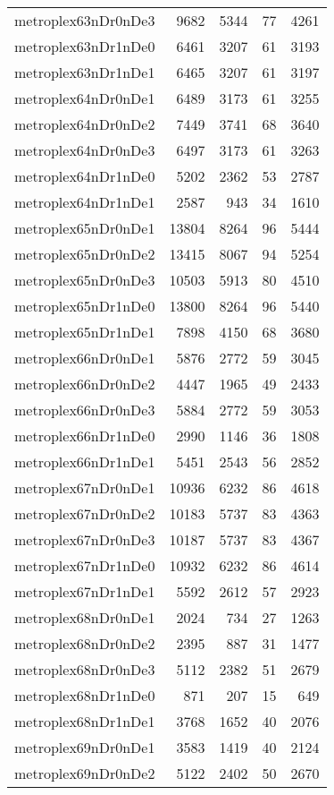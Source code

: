 \begin{longtable}{lrrrr}
metroplex63nDr0nDe3 & 9682 & 5344 & 77 & 4261 \\
metroplex63nDr1nDe0 & 6461 & 3207 & 61 & 3193 \\
metroplex63nDr1nDe1 & 6465 & 3207 & 61 & 3197 \\
metroplex64nDr0nDe1 & 6489 & 3173 & 61 & 3255 \\
metroplex64nDr0nDe2 & 7449 & 3741 & 68 & 3640 \\
metroplex64nDr0nDe3 & 6497 & 3173 & 61 & 3263 \\
metroplex64nDr1nDe0 & 5202 & 2362 & 53 & 2787 \\
metroplex64nDr1nDe1 & 2587 & 943 & 34 & 1610 \\
metroplex65nDr0nDe1 & 13804 & 8264 & 96 & 5444 \\
metroplex65nDr0nDe2 & 13415 & 8067 & 94 & 5254 \\
metroplex65nDr0nDe3 & 10503 & 5913 & 80 & 4510 \\
metroplex65nDr1nDe0 & 13800 & 8264 & 96 & 5440 \\
metroplex65nDr1nDe1 & 7898 & 4150 & 68 & 3680 \\
metroplex66nDr0nDe1 & 5876 & 2772 & 59 & 3045 \\
metroplex66nDr0nDe2 & 4447 & 1965 & 49 & 2433 \\
metroplex66nDr0nDe3 & 5884 & 2772 & 59 & 3053 \\
metroplex66nDr1nDe0 & 2990 & 1146 & 36 & 1808 \\
metroplex66nDr1nDe1 & 5451 & 2543 & 56 & 2852 \\
metroplex67nDr0nDe1 & 10936 & 6232 & 86 & 4618 \\
metroplex67nDr0nDe2 & 10183 & 5737 & 83 & 4363 \\
metroplex67nDr0nDe3 & 10187 & 5737 & 83 & 4367 \\
metroplex67nDr1nDe0 & 10932 & 6232 & 86 & 4614 \\
metroplex67nDr1nDe1 & 5592 & 2612 & 57 & 2923 \\
metroplex68nDr0nDe1 & 2024 & 734 & 27 & 1263 \\
metroplex68nDr0nDe2 & 2395 & 887 & 31 & 1477 \\
metroplex68nDr0nDe3 & 5112 & 2382 & 51 & 2679 \\
metroplex68nDr1nDe0 & 871 & 207 & 15 & 649 \\
metroplex68nDr1nDe1 & 3768 & 1652 & 40 & 2076 \\
metroplex69nDr0nDe1 & 3583 & 1419 & 40 & 2124 \\
metroplex69nDr0nDe2 & 5122 & 2402 & 50 & 2670 \\

\end{longtable}

